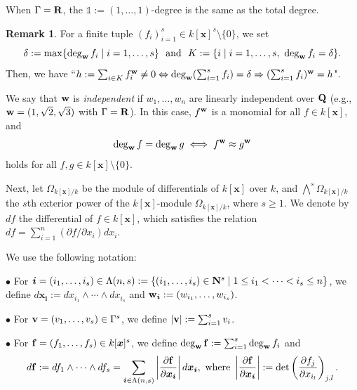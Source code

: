 \documentclass{amsart}
\theoremstyle{plain}
\theoremstyle{definition}
\newtheorem{rem}[thm]{Remark}
\newcommand{\zs}{\{ 0\} }
\newcommand{\sm}{\setminus}
\newcommand{\nd}{\noindent}
\newcommand{\R}{{\bf R}}
\newcommand{\Q}{{\bf Q}}
\newcommand{\N}{{\bf N}}
\newcommand{\x}{{\boldsymbol x}}
\newcommand{\w}{{\bf w}}
\newcommand{\bv}{{\bf v}}
\newcommand{\bi}{{\boldsymbol i}}
\newcommand{\ff}{{\bf f}}
\newcommand{\kx}{k[\x]}
\newcommand{\degww  }{\mathop{\rm deg}_{\w }\nolimits}
\begin{document}
When $\Gamma =\R $, 
the $\mathbb{1}:=(1,\ldots ,1)$-degree is the same as the total degree. 




\begin{rem}\label{rem:principle}\rm 
For a finite tuple $(f_i)_{i=1}^s\in \kx ^s\sm \zs $, 
we set 
$$
\delta :=\max \{ \degww  f_i\mid i=1,\ldots ,s\} 
\text{ \ and \ }
K:=\{ i \mid i=1,\ldots ,s,\ \degww  f_i=\delta \} . 
$$
Then, 
we have 
``$h:=\sum _{i\in K}f_i^{\w }\ne 0
\Leftrightarrow \degww  (\sum _{i=1}^sf_i)=\delta 
\Rightarrow 
(\sum _{i=1}^sf_i)^{\w }=h$". 
\end{rem}


We say that $\w $ is {\it independent} 
if $w_1,\ldots ,w_n$ are linearly independent over $\Q $ 
(e.g., $\w =(1,\sqrt{2},\sqrt{3})$ with $\Gamma =\R $). 
In this case, 
$f^{\w }$ is a monomial for all $f\in \kx $, 
and 
\begin{equation}\label{eq:approx}
\degww  f=\degww  g\iff f^{\w }\approx g^{\w } 
\end{equation}
holds for all $f,g\in \kx \sm \zs $. 



Next, let $\Omega _{\kx /k}$ be the module of 
differentials of $\kx $ over $k$, 
and $\bigwedge ^s\Omega _{\kx /k}$ 
the $s$th exterior power of the $\kx $-module $\Omega _{\kx /k}$, 
where $s\ge 1$. 
We denote by $df$ the differential of $f\in \kx $, 
which satisfies the relation $df=\sum _{i=1}^n(\partial f/\partial x_i)dx_i$. 



We use the following notation: 


\nd $\bullet $ 
For 
$\bi =(i_1,\ldots ,i_s)
\in \Lambda (n,s):=\{ (i_1,\ldots ,i_s)\in \N ^s\mid 
1\le i_1<\cdots <i_s\le n\} $, 
we define 
$d\x _{\bi }:=dx_{i_1}\wedge \cdots \wedge dx_{i_s}$ 
and $\w _{\bi }:=(w_{i_1},\ldots ,w_{i_s})$. 


\nd $\bullet $ 
For $\bv =(v_1,\ldots ,v_s)\in \Gamma ^s$, 
we define $|\bv |:=\sum _{i=1}^sv_i$. 


\nd $\bullet $ 
For $\ff =(f_1,\ldots ,f_s)\in \kx ^s$, 
we define 
$\degww \ff :=\sum _{i=1}^s\degww f_i$ and 
\begin{equation}\label{eq:dff}
d\ff :=df_1\wedge \cdots \wedge df_s
=\sum _{\bi \in \Lambda (n,s)}
\left|\frac{\partial \ff }{\partial \x _{\bi }}\right|
d\x _{\bi }, \text{ where }
\left|\frac{\partial \ff }{\partial \x _{\bi }}\right|
:=\det \left(
\dfrac{\partial f_j}{\partial x_{i_l}}
\right)_{j,l}. 
\end{equation}
\end{document}
